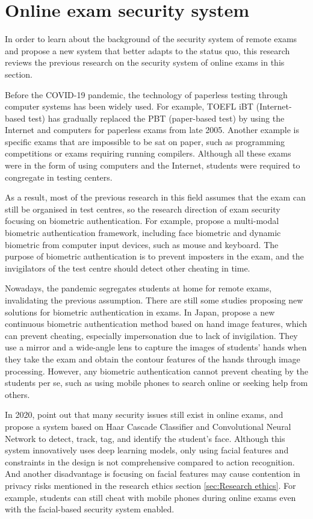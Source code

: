 \section{Online exam security system}
\label{sec:Online exam security system}
In order to learn about the background of the security system of remote exams and propose a new system that better adapts to the status quo, this research reviews the previous research on the security system of online exams in this section.

Before the COVID-19 pandemic, the technology of paperless testing through computer systems has been widely used. For example, TOEFL iBT (Internet-based test) has gradually replaced the PBT (paper-based test) by using the Internet and computers for paperless exams from late 2005.
Another example is specific exams that are impossible to be sat on paper, such as programming competitions or exams requiring running compilers.
Although all these exams were in the form of using computers and the Internet, students were required to congregate in testing centers.

As a result, most of the previous research in this field assumes that the exam can still be organised in test centres, so the research direction of exam security focusing on biometric authentication. For example, \citet{traore2017ensuring} propose a multi-modal biometric authentication framework, including face biometric and dynamic biometric from computer input devices, such as mouse and keyboard. The purpose of biometric authentication is to prevent imposters in the exam, and the invigilators of the test centre should detect other cheating in time.

Nowadays, the pandemic segregates students at home for remote exams, invalidating the previous assumption. There are still some studies proposing new solutions for biometric authentication in exams. 
In Japan, \citet{Akiko202144107} propose a new continuous biometric authentication method based on hand image features, which can prevent cheating, especially impersonation due to lack of invigilation. 
They use a mirror and a wide-angle lens to capture the images of students' hands when they take the exam and obtain the contour features of the hands through image processing.
However, any biometric authentication cannot prevent cheating by the students per se, such as using mobile phones to search online or seeking help from others.

In 2020, \citet{garg2020convolutional} point out that many security issues still exist in online exams, and propose a system based on Haar Cascade Classifier and Convolutional Neural Network to detect, track, tag, and identify the student's face.
Although this system innovatively uses deep learning models, only using facial features and constraints in the design is not comprehensive compared to action recognition.
And another disadvantage is focusing on facial features may cause contention in privacy risks mentioned in the research ethics section \ref{sec:Research ethics}.
For example, students can still cheat with mobile phones during online exams even with the facial-based security system enabled.

